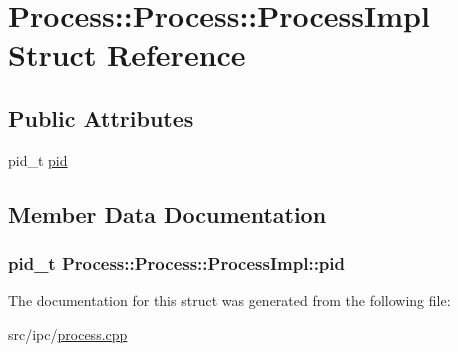 \hypertarget{structProcess_1_1ProcessImpl}{
\section{Process::Process::ProcessImpl Struct Reference}
\label{structProcess_1_1ProcessImpl}
}
\subsection*{Public Attributes}
\begin{CompactItemize}
\item 
pid\_\-t \hyperlink{structProcess_1_1ProcessImpl_4a371b681b6e94bd762a92bbb6b49249}{pid}
\end{CompactItemize}


\subsection{Member Data Documentation}
\hypertarget{structProcess_1_1ProcessImpl_4a371b681b6e94bd762a92bbb6b49249}{
\subsubsection[{pid}]{\setlength{\rightskip}{0pt plus 5cm}pid\_\-t Process::Process::ProcessImpl::pid}}
\label{structProcess_1_1ProcessImpl_4a371b681b6e94bd762a92bbb6b49249}




The documentation for this struct was generated from the following file:\begin{CompactItemize}
\item 
src/ipc/\hyperlink{process_8cpp}{process.cpp}\end{CompactItemize}
